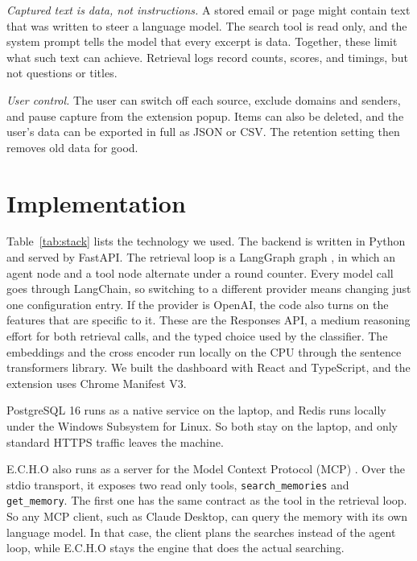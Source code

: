 \documentclass[conference]{IEEEtran}
\begin{document}
\textit{Captured text is data, not instructions.} A stored email or page might contain text that was written to steer a language model. The search tool is read only, and the system prompt tells the model that every excerpt is data. Together, these limit what such text can achieve. Retrieval logs record counts, scores, and timings, but not questions or titles.

\textit{User control.} The user can switch off each source, exclude domains and senders, and pause capture from the extension popup. Items can also be deleted, and the user's data can be exported in full as JSON or CSV. The retention setting then removes old data for good.

\section{Implementation}\label{sec:impl}
Table~\ref{tab:stack} lists the technology we used. The backend is written in Python and served by FastAPI. The retrieval loop is a LangGraph graph \cite{b5}, in which an agent node and a tool node alternate under a round counter. Every model call goes through LangChain, so switching to a different provider means changing just one configuration entry. If the provider is OpenAI, the code also turns on the features that are specific to it. These are the Responses API, a medium reasoning effort for both retrieval calls, and the typed choice used by the classifier. The embeddings and the cross encoder run locally on the CPU through the sentence transformers library. We built the dashboard with React and TypeScript, and the extension uses Chrome Manifest V3.

PostgreSQL 16 runs as a native service on the laptop, and Redis runs locally under the Windows Subsystem for Linux. So both stay on the laptop, and only standard HTTPS traffic leaves the machine.

E.C.H.O also runs as a server for the Model Context Protocol (MCP) \cite{b17}. Over the stdio transport, it exposes two read only tools, \texttt{search\_memories} and \texttt{get\_memory}. The first one has the same contract as the tool in the retrieval loop. So any MCP client, such as Claude Desktop, can query the memory with its own language model. In that case, the client plans the searches instead of the agent loop, while E.C.H.O stays the engine that does the actual searching.
\end{document}
